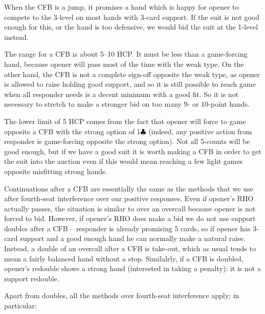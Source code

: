 \documentclass{article}
\newcommand{\cz}{\clubsuit}
\begin{document}
When the CFB is a jump, it promises a hand which is happy for opener to compete to the 3-level on most hands with 3-card support. If the suit is not good enough for this, or the hand is too defensive, we would bid the suit at the 1-level instead.

The range for a CFB is about 5--10 HCP. It must be less than a game-forcing hand, because opener will pass most of the time with the weak type. On the other hand, the CFB is not a complete sign-off opposite the weak type, as opener is allowed to raise holding good support, and so it is still possible to reach game when all responder needs is a decent minimum with a good fit. So it is not necessary to stretch to make a stronger bid on too many 9- or 10-point hands.

The lower limit of 5 HCP comes from the fact that opener will force to game opposite a CFB with the strong option of $1\cz$ (indeed, any positive action from responder is game-forcing opposite the strong option). Not all 5-counts will be good enough, but if we have a good suit it is worth making a CFB in order to get the suit into the auction even if this would mean reaching a few light games opposite misfitting strong hands.

\vspace{4mm}
Continuations after a CFB are essentially the same as the methods that we use after fourth-seat interference over our positive responses. Even if opener's RHO actually passes, the situation is similar to over an overcall because opener is not forced to bid. However, if opener's RHO does make a bid we do not use support doubles after a CFB -- responder is already promising 5 cards, so if opener has 3-card support and a good enough hand he can normally make a natural raise. Instead, a double of an overcall after a CFB is take-out, which as usual tends to mean a fairly balanced hand without a stop. Similalrly, if a CFB is doubled, opener's redouble shows a strong hand (interested in taking a penalty): it is not a support redouble.

Apart from doubles, all the methods over fourth-seat interference apply; in particular:
\end{document}
